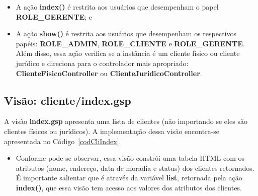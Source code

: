 \begin{itemize}

\item A ação {\bf index()} é  restrita aos usuários que desempenham o papel {\bf
  ROLE\_GERENTE}; e 

\vspace{0,3cm}

\item A ação {\bf show()} é restrita aos usuários que desempenham os respectivos
  papéis:  {\bf ROLE\_ADMIN},  {\bf ROLE\_CLIENTE}  e {\bf  ROLE\_GERENTE}. Além
  disso,  essa ação  verifica se  a  instância é  um cliente  físico ou  cliente
  jurídico   e   direciona   para    o   controlador   mais   apropriado:   {\bf
    ClienteFisicoController} ou {\bf ClienteJuridicoController}.  

\end{itemize}

\vspace{0.3cm}

\subsection{Visão: cliente/index.gsp}

\vspace{0.5cm}

A visão {\bf index.gsp} apresenta uma  lista de clientes (não importando se eles
são  clientes físicos ou  jurídicos).  A  implementação dessa  visão encontra-se
apresentada no Código~\ref{codCliIndex}. 

\vspace{0.3cm}

\begin{itemize}

\item  Conforme pode-se observar,  essa visão  constrói uma  tabela HTML  com os
  atributos (nome, endereço, data de  moradia e status) dos clientes retornados.
  É importante  salientar que é através  da variável {\bf  list}, retornada pela
  ação {\bf  index()}, que essa visão  tem acesso aos valores  dos atributos dos
  clientes.  

\end{itemize}

\newpage

